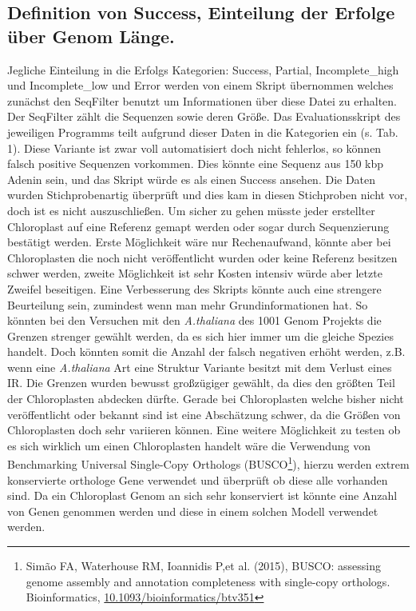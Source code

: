 \documentclass{scrartcl}
\begin{document}
\subsection{Definition von Success, Einteilung der Erfolge über Genom Länge.}
\label{sec-5-1}
Jegliche Einteilung in die Erfolgs Kategorien: Success, Partial, Incomplete\_high und Incomplete\_low und Error werden von einem Skript übernommen welches zunächst den SeqFilter benutzt um Informationen über diese Datei zu erhalten. 
Der SeqFilter zählt die Sequenzen sowie deren Größe. Das Evaluationsskript des jeweiligen Programms teilt aufgrund dieser Daten in die Kategorien ein (s. Tab. 1). Diese Variante ist zwar voll automatisiert
doch nicht fehlerlos, so können falsch positive Sequenzen vorkommen. Dies könnte eine Sequenz aus 150 kbp Adenin sein, und das Skript würde es als einen Success ansehen. Die Daten wurden Stichprobenartig überprüft und dies 
kam in diesen Stichproben nicht vor, doch ist es nicht auszuschließen. Um sicher zu gehen müsste jeder erstellter Chloroplast auf eine Referenz gemapt werden oder sogar durch Sequenzierung bestätigt werden. Erste Möglichkeit
wäre nur Rechenaufwand, könnte aber bei Chloroplasten die noch nicht veröffentlicht wurden oder keine Referenz besitzen schwer werden, zweite Möglichkeit ist sehr Kosten intensiv würde aber letzte Zweifel beseitigen. 
Eine Verbesserung des Skripts könnte auch eine strengere Beurteilung sein, zumindest wenn man mehr Grundinformationen hat. So könnten bei den Versuchen mit den \emph{A.thaliana} des 1001 Genom Projekts die Grenzen strenger gewählt werden, 
da es sich hier immer um die gleiche Spezies handelt. Doch könnten somit die Anzahl der falsch negativen erhöht werden, z.B. wenn eine \emph{A.thaliana} Art eine Struktur Variante besitzt mit dem Verlust eines IR. Die Grenzen wurden 
bewusst großzügiger gewählt, da dies den größten Teil der Chloroplasten abdecken dürfte. Gerade bei Chloroplasten welche bisher nicht veröffentlicht oder bekannt sind ist eine Abschätzung schwer, da die Größen von Chloroplasten
doch sehr variieren können. Eine weitere Möglichkeit zu testen ob es sich wirklich um einen Chloroplasten handelt wäre die Verwendung von Benchmarking Universal Single-Copy Orthologs (BUSCO\footnote{Simão FA, Waterhouse RM, Ioannidis P,et al. (2015), BUSCO: assessing genome assembly and annotation completeness with single-copy orthologs.  Bioinformatics, \url{10.1093/bioinformatics/btv351}}), hierzu werden extrem konservierte
orthologe Gene verwendet und überprüft ob diese alle vorhanden sind. Da ein Chloroplast Genom an sich sehr konserviert ist könnte eine Anzahl von Genen genommen werden und diese in einem solchen Modell verwendet werden. 
\end{document}
